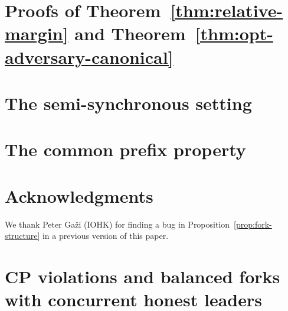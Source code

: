 \documentclass{article}
\theoremstyle{definition}
\begin{document}
\section{Proofs of Theorem~\ref{thm:relative-margin} and Theorem~\ref{thm:opt-adversary-canonical}}
\label{sec:margin-proof}


\section{The semi-synchronous setting}\label{sec:async}\label{sec:async-model}



\section{The common prefix property}\label{sec:cp}\label{sec:cp-model}



\section*{Acknowledgments}
We thank Peter Ga\v{z}i (IOHK) for finding a bug in Proposition~\ref{prop:fork-structure} in a previous version of this paper. 




\appendix


% 


\break
\newpage
\section{CP violations and balanced forks with concurrent honest leaders}
\label{sec:cp-forks}






% 




% 
\end{document}
